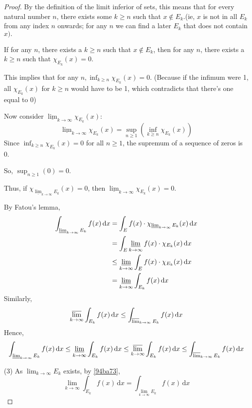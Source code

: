 \begin{proof}
By the definition of the limit inferior of sets, this means that for every natural number $n$, there exists some $k\geq n$ such that $x\notin E_k$.(ie, $x$ is not in all $E_k$ from any index $n$ onwards; for any $n$ we can find a later $E_k$ that does not contain $x).$

If for any $n$, there exists a $k\geq n$ such that $x\notin E_k$, then for any $n$, there exists a $k\geq n$ such that $\chi_{E_k}(x)=0.$

This implies that for any $n,\inf_{k\geq n}\chi_{E_k}(x)=0.$ (Because if the infimum were 1, all $\chi_{E_k}(x)$ for $k\geq n$ would have to be 1, which contradicts that there's one equal to 0)

Now consider $\underline{\lim}_{k\to\infty}\chi_{E_k}(x):$
\[
\underline{\lim}_{k\to\infty}\chi_{E_k}(x)=\sup_{n\geq1}(\inf_{k\geq n}\chi_{E_k}(x))
\]
Since $\inf_{k\geq n}\chi_{E_k}(x)=0$ for all $n\geq1$, the supremum of a sequence of zeros is 0.

So, $\sup_{n\geq1}(0)=0.$

Thus, if $\chi_{\underline{\lim}_{k\to\infty}E_k}(x)=0$, then $\underline{\lim}_{k\to\infty}\chi_{E_k}(x)=0.$


By Fatou's lemma,
\[
\begin{aligned}
\int_{\varliminf_{ k \to \infty } E_k} f(x) \, \mathrm{d}x  & =\int_{E}^{} f(x)\cdot \chi_{\varliminf_{ k \to \infty } E_k}(x) \, \mathrm{d}x  \\
 & =\int_{E}^{} \varliminf_{ k \to \infty } f(x)\cdot \chi_{E_k}(x) \, \mathrm{d}x  \\
 & \leq \varliminf_{ k \to \infty } \int_{E}^{} f(x)\cdot \chi_{E_k}(x) \, \mathrm{d}x  \\
 & =\varliminf_{ k \to \infty } \int_{E_k}^{} f(x) \, \mathrm{d}x 
\end{aligned}
\]
Similarly,
\[
\varlimsup_{ k \to \infty } \int_{E_k}^{} f(x) \, \mathrm{d}x \leq  \int_{\varlimsup_{ k \to \infty } E_k}^{} f(x) \, \mathrm{d}x 
\]
Hence,
\begin{equation}
\int_{\varliminf_{ k \to \infty } E_k}^{} f(x) \, \mathrm{d}x \leq\varliminf_{ k \to \infty } \int_{E_k}^{} f(x) \, \mathrm{d}x \leq \varlimsup_{ k \to \infty } \int_{E_k}^{} f(x) \, \mathrm{d}x \leq  \int_{\varlimsup_{ k \to \infty } E_k}^{} f(x) \, \mathrm{d}x
\label{94ba73}
\end{equation}

(3)
As $\lim_{ k \to \infty }E_k$ exists, by \cref{94ba73},
\[
\lim_{ k \to \infty } \int_{E_k}^{} f(x) \, \mathrm{d}x =\int_{\lim_{ k \to \infty }E_k }^{} f(x) \, \mathrm{d}x
\]
\end{proof}

